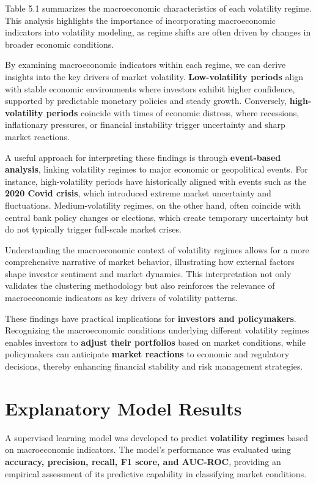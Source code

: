 Table 5.1 summarizes the macroeconomic characteristics of each volatility regime. This analysis highlights the importance of incorporating macroeconomic indicators into volatility modeling, as regime shifts are often driven by changes in broader economic conditions.

By examining macroeconomic indicators within each regime, we can derive insights into the key drivers of market volatility. \textbf{Low-volatility periods} align with stable economic environments where investors exhibit higher confidence, supported by predictable monetary policies and steady growth. Conversely, \textbf{high-volatility periods} coincide with times of economic distress, where recessions, inflationary pressures, or financial instability trigger uncertainty and sharp market reactions.

A useful approach for interpreting these findings is through \textbf{event-based analysis}, linking volatility regimes to major economic or geopolitical events. For instance, high-volatility periods have historically aligned with events such as the \textbf{2020 Covid crisis}, which introduced extreme market uncertainty and fluctuations. Medium-volatility regimes, on the other hand, often coincide with central bank policy changes or elections, which create temporary uncertainty but do not typically trigger full-scale market crises.

Understanding the macroeconomic context of volatility regimes allows for a more comprehensive narrative of market behavior, illustrating how external factors shape investor sentiment and market dynamics. This interpretation not only validates the clustering methodology but also reinforces the relevance of macroeconomic indicators as key drivers of volatility patterns.

These findings have practical implications for \textbf{investors and policymakers}. Recognizing the macroeconomic conditions underlying different volatility regimes enables investors to \textbf{adjust their portfolios} based on market conditions, while policymakers can anticipate \textbf{market reactions} to economic and regulatory decisions, thereby enhancing financial stability and risk management strategies.

\section{Explanatory Model Results}

A supervised learning model was developed to predict \textbf{volatility regimes} based on macroeconomic indicators. The model’s performance was evaluated using \textbf{accuracy, precision, recall, F1 score, and AUC-ROC}, providing an empirical assessment of its predictive capability in classifying market conditions.

